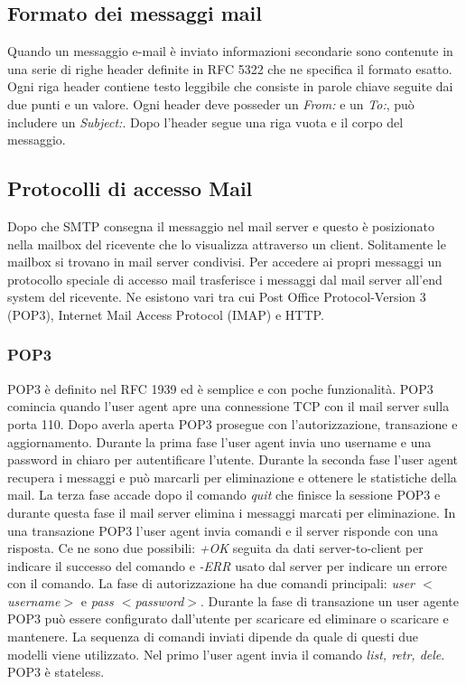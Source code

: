 \subsection{Formato dei messaggi mail}
Quando un messaggio e-mail \`e inviato informazioni secondarie sono contenute in una serie di righe header definite in RFC 5322 che ne specifica il formato esatto. Ogni riga header contiene testo leggibile che
consiste in parole chiave seguite dai due punti e un valore. Ogni header deve posseder un \emph{From:} e un \emph{To:}, pu\`o includere un \emph{Subject:}. Dopo l'header segue una riga vuota e il corpo del
messaggio. 
\subsection{Protocolli di accesso Mail}
Dopo che SMTP consegna il messaggio nel mail server e questo \`e posizionato nella mailbox del ricevente che lo visualizza attraverso un client. Solitamente le mailbox si trovano in mail server condivisi. Per 
accedere ai propri messaggi un protocollo speciale di accesso mail trasferisce i messaggi dal mail server all'end system del ricevente. Ne esistono vari tra cui Post Office Protocol-Version 3 (POP3), Internet
Mail Access Protocol (IMAP) e HTTP.
\subsubsection{POP3}
POP3 \`e definito nel RFC 1939 ed \`e semplice e con poche funzionalit\`a. POP3 comincia quando l'user agent apre una connessione TCP con il mail server sulla porta 110. Dopo averla aperta POP3 prosegue 
con l'autorizzazione, transazione e aggiornamento. Durante la prima fase l'user agent invia uno username  e una password in chiaro per autentificare l'utente. Durante la seconda fase l'user agent recupera i
messaggi e pu\`o marcarli per eliminazione e ottenere le statistiche della mail. La terza fase accade dopo il comando \emph{quit} che finisce la sessione POP3 e durante questa fase il mail server elimina i 
messaggi marcati per eliminazione. In una transazione POP3 l'user agent invia comandi e il server risponde con una risposta. Ce ne sono due possibili: \emph{+OK} seguita da dati server-to-client per indicare
il successo del comando e \emph{-ERR} usato dal server per indicare un errore con il comando. La fase di autorizzazione ha due comandi principali: \emph{user $<$username$>$} e \emph{
pass $<$password$>$}.  Durante la fase di transazione un user agente POP3 pu\`o essere configurato dall'utente per scaricare ed eliminare o scaricare e mantenere. La sequenza di comandi inviati dipende
da quale di questi due modelli viene utilizzato. Nel primo l'user agent invia il comando \emph{list, retr, dele}. POP3 \`e stateless.
